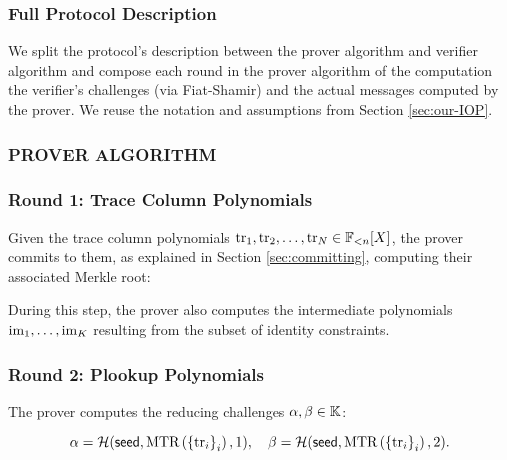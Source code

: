 \subsubsection{Full Protocol Description}

We split the protocol's description between the prover algorithm and verifier algorithm and compose each round in the prover algorithm of the computation the verifier's challenges (via Fiat-Shamir) and the actual messages computed by the prover. We reuse the notation and assumptions from Section \ref{sec:our-IOP}.

\subsubsection*{PROVER ALGORITHM}

\subsubsection*{Round 1: Trace Column Polynomials}

Given the trace column polynomials $\text{tr}_1,\text{tr}_2,\dots,\text{tr}_N \in \mathbb{F}_{<n}[X]$, the prover commits to them, as explained in Section \ref{sec:committing}, computing their associated Merkle root:

During this step, the prover also computes the intermediate polynomials $\text{im}_1,\dots,\text{im}_K$ resulting from the subset of identity constraints.



\subsubsection*{Round 2: Plookup Polynomials}\label{par:round-2}



\ifNOPOLYGON
The prover computes the reducing challenges $\alpha, \beta \in \mathbb{K}$:

\[
  \alpha = \mathcal{H}(\textsf{seed},\text{MTR}\left(\left\{\text{tr}_i\right\}_i\right),1),\quad \beta = \mathcal{H}(\textsf{seed},\text{MTR}\left(\left\{\text{tr}_i\right\}_i\right),2).
\]
\fi

